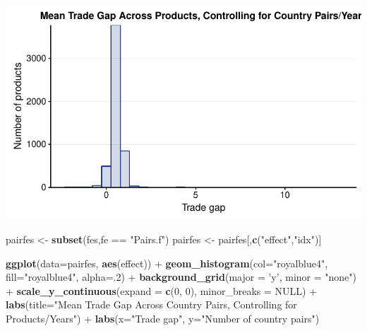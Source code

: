 \documentclass[10pt,]{article}
\newenvironment{Shaded}{\begin{snugshade}}{\end{snugshade}}
\newcommand{\KeywordTok}[1]{\textcolor[rgb]{0.13,0.29,0.53}{\textbf{{#1}}}}
\newcommand{\DataTypeTok}[1]{\textcolor[rgb]{0.13,0.29,0.53}{{#1}}}
\newcommand{\DecValTok}[1]{\textcolor[rgb]{0.00,0.00,0.81}{{#1}}}
\newcommand{\StringTok}[1]{\textcolor[rgb]{0.31,0.60,0.02}{{#1}}}
\newcommand{\OtherTok}[1]{\textcolor[rgb]{0.56,0.35,0.01}{{#1}}}
\newcommand{\NormalTok}[1]{{#1}}
\begin{document}
\begin{center}\includegraphics{Figs/value_summary-11} \end{center}

\begin{Shaded}
\begin{Highlighting}[]
\NormalTok{pairfes <-}\StringTok{ }\KeywordTok{subset}\NormalTok{(fes,fe ==}\StringTok{ "Pairs.f"}\NormalTok{)}
\NormalTok{pairfes <-}\StringTok{ }\NormalTok{pairfes[,}\KeywordTok{c}\NormalTok{(}\StringTok{"effect"}\NormalTok{,}\StringTok{"idx"}\NormalTok{)]}

\KeywordTok{ggplot}\NormalTok{(}\DataTypeTok{data=}\NormalTok{pairfes, }\KeywordTok{aes}\NormalTok{(effect)) +}
\StringTok{  }\KeywordTok{geom_histogram}\NormalTok{(}\DataTypeTok{col=}\StringTok{"royalblue4"}\NormalTok{,}
                 \DataTypeTok{fill=}\StringTok{"royalblue4"}\NormalTok{,}
                 \DataTypeTok{alpha=}\NormalTok{.}\DecValTok{2}\NormalTok{) +}
\StringTok{  }\KeywordTok{background_grid}\NormalTok{(}\DataTypeTok{major =} \StringTok{'y'}\NormalTok{, }\DataTypeTok{minor =} \StringTok{"none"}\NormalTok{) +}
\StringTok{  }\KeywordTok{scale_y_continuous}\NormalTok{(}\DataTypeTok{expand =} \KeywordTok{c}\NormalTok{(}\DecValTok{0}\NormalTok{, }\DecValTok{0}\NormalTok{), }\DataTypeTok{minor_breaks =} \OtherTok{NULL}\NormalTok{) +}
\StringTok{  }\KeywordTok{labs}\NormalTok{(}\DataTypeTok{title=}\StringTok{"Mean Trade Gap Across Country Pairs, Controlling for Products/Years"}\NormalTok{) +}
\StringTok{  }\KeywordTok{labs}\NormalTok{(}\DataTypeTok{x=}\StringTok{"Trade gap"}\NormalTok{, }\DataTypeTok{y=}\StringTok{"Number of country pairs"}\NormalTok{)}
\end{Highlighting}
\end{Shaded}
\end{document}
